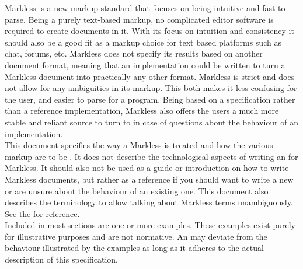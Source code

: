 Markless is a new markup standard that focuses on being intuitive and fast to parse. Being a purely text-based markup, no complicated editor software is required to create documents in it. With its focus on intuition and consistency it should also be a good fit as a markup choice for text based platforms such as chat, forums, etc. Markless does not specify its results based on another document format, meaning that an implementation could be written to turn a Markless document into practically any other format. Markless is strict and does not allow for any ambiguities in its markup. This both makes it less confusing for the user, and easier to parse for a program. Being based on a specification rather than a reference implementation, Markless also offers the users a much more stable and reliant source to turn to in case of questions about the behaviour of an implementation.\\

This document specifies the way a Markless  is treated and how the various markup  are to be . It does not describe the technological aspects of writing an  for Markless. It should also not be used as a guide or introduction on how to write Markless documents, but rather as a reference if you should want to write a new  or are unsure about the behaviour of an existing one. This document also describes the terminology to allow talking about Markless terms unambiguously. See the  for reference. \\

Included in most sections are one or more examples. These examples exist purely for illustrative purposes and are not normative. An  may deviate from the behaviour illustrated by the examples as long as it adheres to the actual description of this specification.

